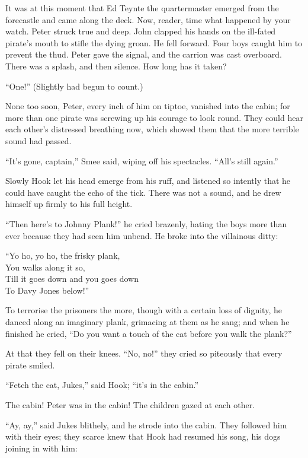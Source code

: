 It was at this moment that Ed Teynte the quartermaster emerged from the
forecastle and came along the deck. Now, reader, time what happened by
your watch. Peter struck true and deep. John clapped his hands on the
ill-fated pirate's mouth to stifle the dying groan. He fell forward.
Four boys caught him to prevent the thud. Peter gave the signal, and
the carrion was cast overboard. There was a splash, and then silence.
How long has it taken?

``One!'' (Slightly had begun to count.)

None too soon, Peter, every inch of him on tiptoe, vanished into the
cabin; for more than one pirate was screwing up his courage to look
round. They could hear each other's distressed breathing now, which
showed them that the more terrible sound had passed.

``It's gone, captain,'' Smee said, wiping off his spectacles. ``All's
still again.''

Slowly Hook let his head emerge from his ruff, and listened so intently
that he could have caught the echo of the tick. There was not a sound,
and he drew himself up firmly to his full height.

``Then here's to Johnny Plank!'' he cried brazenly, hating the boys more
than ever because they had seen him unbend. He broke into the
villainous ditty:

\begin{center}
``Yo ho, yo ho, the frisky plank,\\
    You walks along it so,\\
Till it goes down and you goes down\\
    To Davy Jones below!''
\end{center}

To terrorise the prisoners the more, though with a certain loss of
dignity, he danced along an imaginary plank, grimacing at them as he
sang; and when he finished he cried, ``Do you want a touch of the cat
before you walk the plank?''

At that they fell on their knees. ``No, no!'' they cried so piteously
that every pirate smiled.

``Fetch the cat, Jukes,'' said Hook; ``it's in the cabin.''

The cabin! Peter was in the cabin! The children gazed at each other.

``Ay, ay,'' said Jukes blithely, and he strode into the cabin. They
followed him with their eyes; they scarce knew that Hook had resumed
his song, his dogs joining in with him:

